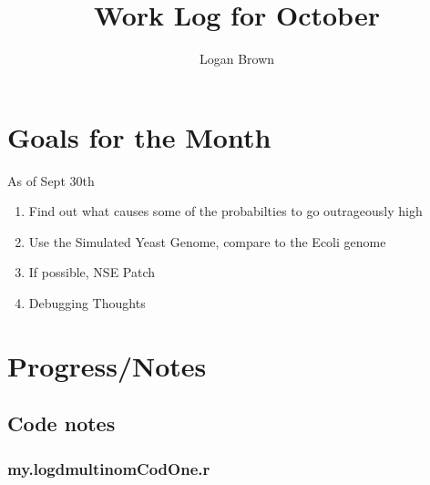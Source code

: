 
\usepackage{pdfpages}

\title{Work Log for October}
\author{Logan Brown}



\maketitle
\tableofcontents

\newpage


\section{Goals for the Month}
As of Sept 30th
\begin{enumerate}
\item Find out what causes some of the probabilties to go outrageously high
\item Use the Simulated Yeast Genome, compare to the Ecoli genome
\item If possible, NSE Patch
\item Debugging Thoughts
\end{enumerate}


\section{Progress/Notes}

\subsection{Code notes}

\subsubsection{my.logdmultinomCodOne.r}

